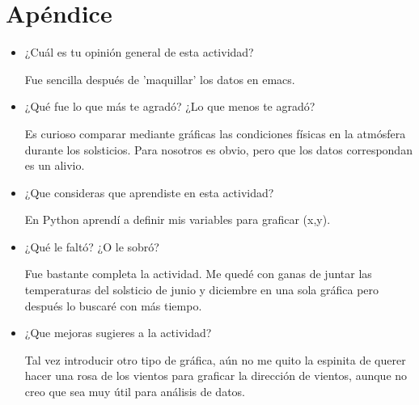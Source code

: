\documentclass[12pt]{article}
\begin{document}
\section{Ap\'endice}
\begin{itemize}
\item ¿Cuál es tu opinión general de esta actividad?

Fue sencilla despu\'es de 'maquillar' los datos en emacs. 
\item ¿Qué fue lo que más te agradó? ¿Lo que menos te agradó?

Es curioso comparar mediante gr\'aficas las condiciones f\'isicas en la atm\'osfera durante los solsticios. Para nosotros es obvio, pero que los datos correspondan es un alivio.
\item ¿Que consideras que aprendiste en esta actividad? 

En Python aprend\'i a definir mis variables para graficar (x,y). 
\item ¿Qué le faltó? ¿O le sobró? 

Fue bastante completa la actividad. Me qued\'e con ganas de juntar las temperaturas del solsticio de junio y diciembre en una sola gr\'afica pero despu\'es lo buscar\'e con m\'as tiempo.
\item ¿Que mejoras sugieres a la actividad?

Tal vez introducir otro tipo de gr\'afica, a\'un no me quito la espinita de querer hacer una rosa de los vientos para graficar la direcci\'on de vientos, aunque no creo que sea muy \'util para an\'alisis de datos. 
\end{itemize}
\end{document}
